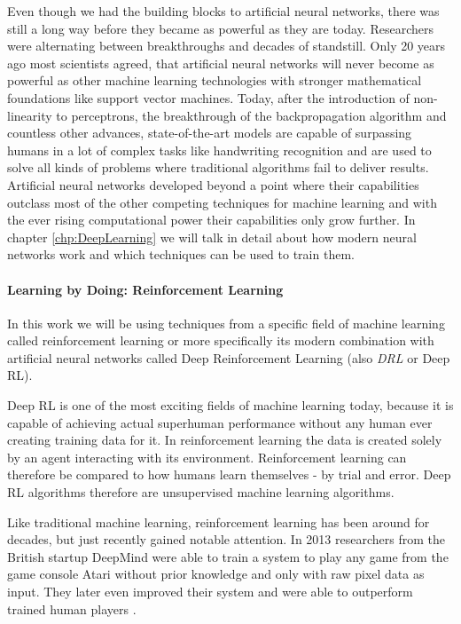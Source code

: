  Even though we had the building blocks to artificial neural networks, there was still a long way before they became as powerful as they are today. Researchers were alternating between breakthroughs and decades of standstill. Only 20 years ago most scientists agreed, that artificial neural networks will never become as powerful as other machine learning technologies with stronger mathematical foundations like support vector machines. Today, after the introduction of non-linearity to perceptrons, the breakthrough of the backpropagation algorithm and countless other advances, state-of-the-art models are capable of surpassing humans in a lot of complex tasks like handwriting recognition and are used to solve all kinds of problems where traditional algorithms fail to deliver results. Artificial neural networks developed beyond a point where their capabilities outclass most of the other competing techniques for machine learning and with the ever rising computational power their capabilities only grow further. In chapter \ref{chp:DeepLearning} we will talk in detail about how modern neural networks work and which techniques can be used to train them.

 \paragraph{Learning by Doing: Reinforcement Learning} In this work we will be using techniques from a specific field of machine learning called reinforcement learning or more specifically its modern combination with artificial neural networks called Deep Reinforcement Learning (also \textit{DRL} or Deep RL).

 Deep RL is one of the most exciting fields of machine learning today, because it is capable of achieving actual superhuman performance without any human ever creating training data for it. In reinforcement learning the data is created solely by an agent interacting with its environment. Reinforcement learning can therefore be compared to how humans learn themselves - by trial and error. Deep RL algorithms therefore are unsupervised machine learning algorithms.

 Like traditional machine learning, reinforcement learning has been around for decades, but just recently gained notable attention. In 2013 researchers from the British startup DeepMind were able to train a system to play any game from the game console Atari without prior knowledge and only with raw pixel data as input. \cite{mnih2013playing} They later even improved their system and were able to outperform trained human players \cite{mnih2015human}.

